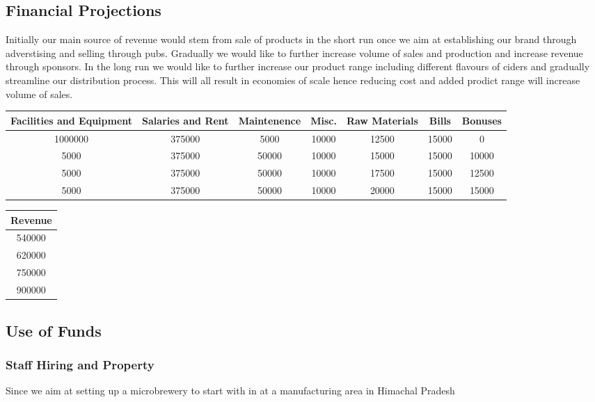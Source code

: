 \documentclass[11pt]{article}
\begin{document}
  \subsection{Financial Projections}
Initially our main source of revenue would stem from sale of products in the short run once we aim at establishing our brand through adverstising and selling through pubs. Gradually we would like to further increase volume of sales and production and increase revenue through sponsors. In the long run we would like to further increase our product range including different flavours of ciders and gradually streamline our distribution process. This will all result in economies of scale hence reducing cost and added prodict range will increase volume of sales.

\begin{center}
\begin{tabular}{| c | c | c | c | c | c | c |}
\hline
Facilities and Equipment & Salaries and Rent  & Maintenence & Misc. & Raw Materials & Bills & Bonuses \\ \hline
1000000 & 375000 & 5000 & 10000 & 12500 & 15000 & 0 \\
5000 & 375000 & 50000 & 10000 & 15000 & 15000 & 10000 \\
5000 & 375000 & 50000 & 10000 & 17500 & 15000 & 12500 \\
5000 & 375000 & 50000 & 10000 & 20000 & 15000 & 15000 \\ \hline
\end{tabular}
\end{center}

\begin{center}
\begin{tabular}{| c | }
\hline
Revenue \\ \hline
540000 \\
620000 \\
750000 \\
900000 \\ \hline
\end{tabular}
\end{center}

  \subsection{Use of Funds}
      \subsubsection{Staff Hiring and Property}
Since we aim at setting up a microbrewery to start with in at a manufacturing area in Himachal Pradesh
\end{document}
